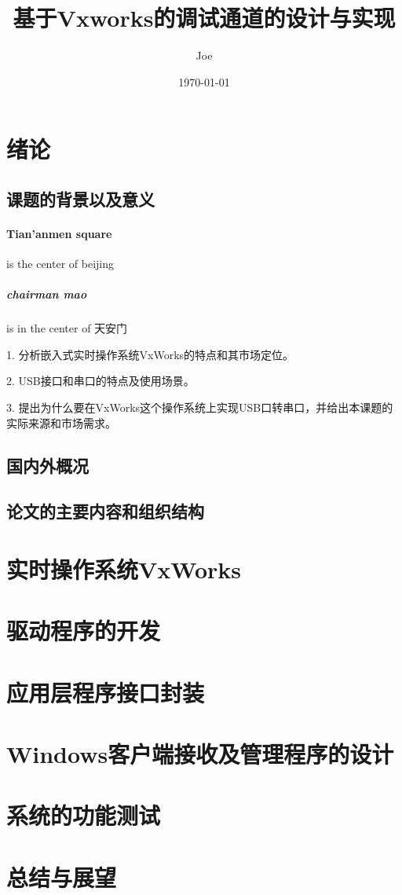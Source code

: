 \documentclass[12pt,UTF-8]{ctexart}
\title{基于Vxworks的调试通道的设计与实现}
\author{Joe}
\date{\today}
\begin{document}
\maketitle %
\tableofcontents 

\section{绪论} 



\subsection{课题的背景以及意义}

\paragraph{Tian'anmen square}
is the center of beijing
\subparagraph{chairman mao}
is in the center of 天安门

1. 分析嵌入式实时操作系统VxWorks的特点和其市场定位。

2. USB接口和串口的特点及使用场景。

3. 提出为什么要在VxWorks这个操作系统上实现USB口转串口，并给出本课题的实际来源和市场需求。

\subsection{国内外概况}


\subsection{论文的主要内容和组织结构}




\section{实时操作系统VxWorks}




\section{驱动程序的开发}



\section{应用层程序接口封装}


\section{Windows客户端接收及管理程序的设计}


\section{系统的功能测试}


\section{总结与展望}


\end{document}
